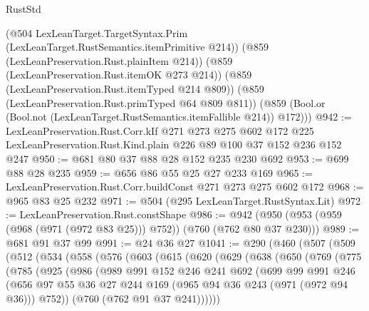 \begin{lexlean}{RustStd}
\begin{coremodule}
      (@504 LexLeanTarget.TargetSyntax.Prim (LexLeanTarget.RustSemantics.itemPrimitive @214))
      (@859 (LexLeanPreservation.Rust.plainItem @214))
      (@859 (LexLeanPreservation.Rust.itemOK @273 @214))
      (@859 (LexLeanPreservation.Rust.itemTyped @214 @809))
      (@859 (LexLeanPreservation.Rust.primTyped @64 @809 @811))
      (@859 (Bool.or (Bool.not (LexLeanTarget.RustSemantics.itemFallible @214)) @172)))
@942 := LexLeanPreservation.Rust.Corr.kIf
    @271
    @273
    @275
    @602
    @172
    @225
    LexLeanPreservation.Rust.Kind.plain
    @226
    @89
    @100
    @37
    @152
    @236
    @152
    @247
@950 := @681 @80 @37 @88 @28 @152 @235 @230 @692
@953 := @699 @88 @28 @235
@959 := @656 @86 @55 @25 @27 @233 @169
@965 := LexLeanPreservation.Rust.Corr.buildConst @271 @273 @275 @602 @172
@968 := @965 @83 @25 @232
@971 := @504 (@295 LexLeanTarget.RustSyntax.Lit)
@972 := LexLeanPreservation.Rust.constShape
@986 := @942 (@950 (@953 (@959 (@968 (@971 (@972 @83 @25))) @752)) (@760 (@762 @80 @37 @230)))
@989 := @681 @91 @37 @99
@991 := @24 @36 @27
@1041 := @290
    (@460
      (@507
        (@509
          (@512
            (@534
              (@558
                (@576
                  (@603
                    (@615
                      (@620
                        (@629
                          (@638
                            (@650
                              (@769
                                (@775
                                  (@785
                                    (@925
                                      (@986
                                        (@989
                                          @991
                                          @152
                                          @246
                                          @241
                                          @692
                                          (@699
                                            @99
                                            @991
                                            @246
                                            (@656
                                              @97
                                              @55
                                              @36
                                              @27
                                              @244
                                              @169
                                              (@965 @94 @36 @243 (@971 (@972 @94 @36)))
                                              @752))
                                          (@760 (@762 @91 @37 @241))))))

\end{coremodule}
\end{lexlean}
